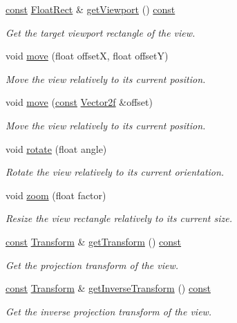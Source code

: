 \begin{DoxyCompactItemize}
\hyperlink{term__entry_8h_a57bd63ce7f9a353488880e3de6692d5a}{const} \hyperlink{namespacesf_ab0d978f5903922a6bdfca1736b71ccc9}{Float\-Rect} \& \hyperlink{classsf_1_1_view_af1db1e4f21d104a9691fd38be9165758}{get\-Viewport} () \hyperlink{term__entry_8h_a57bd63ce7f9a353488880e3de6692d5a}{const} 
\begin{DoxyCompactList}\small\item\em Get the target viewport rectangle of the view. \end{DoxyCompactList}\item 
void \hyperlink{classsf_1_1_view_a0c82144b837caf812f7cb25a43d80c41}{move} (float offset\-X, float offset\-Y)
\begin{DoxyCompactList}\small\item\em Move the view relatively to its current position. \end{DoxyCompactList}\item 
void \hyperlink{classsf_1_1_view_a4c98a6e04fed756dfaff8f629de50862}{move} (\hyperlink{term__entry_8h_a57bd63ce7f9a353488880e3de6692d5a}{const} \hyperlink{namespacesf_a80cea3c46537294fd1d8d428566ad8b2}{Vector2f} \&offset)
\begin{DoxyCompactList}\small\item\em Move the view relatively to its current position. \end{DoxyCompactList}\item 
void \hyperlink{classsf_1_1_view_a5fd3901aae1845586ca40add94faa378}{rotate} (float angle)
\begin{DoxyCompactList}\small\item\em Rotate the view relatively to its current orientation. \end{DoxyCompactList}\item 
void \hyperlink{classsf_1_1_view_a4a72a360a5792fbe4e99cd6feaf7726e}{zoom} (float factor)
\begin{DoxyCompactList}\small\item\em Resize the view rectangle relatively to its current size. \end{DoxyCompactList}\item 
\hyperlink{term__entry_8h_a57bd63ce7f9a353488880e3de6692d5a}{const} \hyperlink{classsf_1_1_transform}{Transform} \& \hyperlink{classsf_1_1_view_a0109dba48aee769126f670a212b3ed7f}{get\-Transform} () \hyperlink{term__entry_8h_a57bd63ce7f9a353488880e3de6692d5a}{const} 
\begin{DoxyCompactList}\small\item\em Get the projection transform of the view. \end{DoxyCompactList}\item 
\hyperlink{term__entry_8h_a57bd63ce7f9a353488880e3de6692d5a}{const} \hyperlink{classsf_1_1_transform}{Transform} \& \hyperlink{classsf_1_1_view_ae7643324b2d8807cf0d9efe9dadfc8cc}{get\-Inverse\-Transform} () \hyperlink{term__entry_8h_a57bd63ce7f9a353488880e3de6692d5a}{const} 
\begin{DoxyCompactList}\small\item\em Get the inverse projection transform of the view. \end{DoxyCompactList}\end{DoxyCompactItemize}


